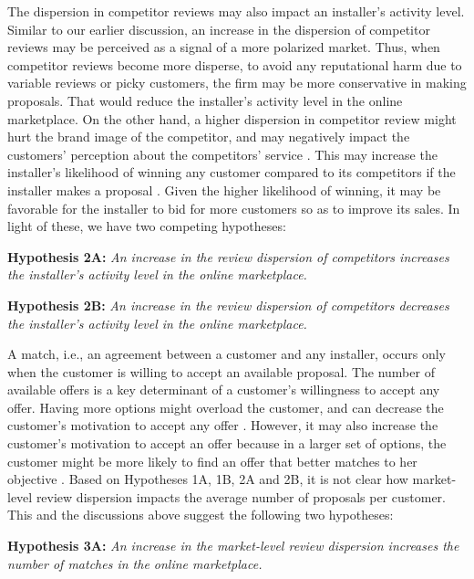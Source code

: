 \documentclass[msom,blindrev]{informs3}
\begin{document}
The dispersion in competitor reviews may also impact an installer's activity level. Similar to our earlier discussion, an increase in the dispersion of competitor reviews may be perceived as a signal of a more polarized market. Thus, when competitor reviews become more disperse, to avoid any reputational harm due to variable reviews or picky customers, the firm may be more conservative in making proposals. That would reduce the installer's activity level in the online marketplace. On the other hand, a higher dispersion in competitor review might hurt the brand image of the competitor, and may negatively impact the customers' perception about the competitors' service \citep{chakraborty2018credibility,chakraborty2018effects,Zhu}. This may increase the installer's likelihood of winning any customer compared to its competitors if the installer makes a proposal \citep{demirag2011risks,moreno2014doing}. Given the higher likelihood of winning, it may be favorable for the installer to bid for more customers so as to improve its sales. In light of these, we have two competing hypotheses:


\noindent\textbf{Hypothesis 2A:} \emph{An increase in the review dispersion of competitors increases the installer's activity level in the online marketplace.}

\noindent\textbf{Hypothesis 2B:} \emph{An increase in the review dispersion of competitors decreases the installer's activity level in the online marketplace.}

A match, i.e., an agreement between a customer and any installer, occurs only when the customer is willing to accept an available proposal. The number of available offers is a key determinant of a customer's willingness to accept any offer. Having more options might overload the customer, and can decrease the customer's motivation to accept any offer \citep{scheibehenne2010can,iyengar2000choice}. However, it may also increase the customer's motivation to accept an offer because in a larger set of options, the customer  might be more likely to find an offer that better matches to her objective \citep{scheibehenne2010can,baumol1956variety}. Based on Hypotheses 1A, 1B, 2A and 2B, it is not clear how market-level review dispersion impacts the average number of proposals per customer. This and the discussions above  suggest the following two hypotheses:


\noindent\textbf{Hypothesis 3A:} \emph{An increase in the market-level review dispersion increases the number of matches in the online marketplace.}
\end{document}
